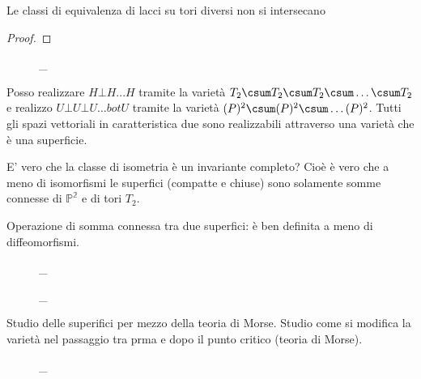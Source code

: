 
\begin{teo}
Le classi di equivalenza di lacci su tori diversi non si intersecano
\end{teo}
\begin{proof}
\end{proof}

\begin{figure}
	\centering 
	
	\caption{\_}
\end{figure}

\begin{oss}
Posso realizzare $H \bot H ... H$ tramite la varietà $T_{2} \csum T_{2} \csum T_{2} \csum \dots \csum T_{2}$ e realizzo $U \bot U \bot U \dots bot U$ tramite la varietà $\mathbb(P)^2 \csum \mathbb(P)^2 \csum \dots \mathbb(P)^2$. Tutti gli spazi vettoriali in caratteristica due sono realizzabili attraverso una varietà che è una superficie.
\end{oss}

E' vero che la classe di isometria è un invariante completo? Cioè è vero che a meno di isomorfismi le superfici (compatte e chiuse) sono solamente somme connesse di $\mathbb{P^2}$ e di tori $T_{2}$.

Operazione di somma connessa tra due superfici: è ben definita a meno di diffeomorfismi.

\begin{figure}
	\centering 
	
	\caption{\_}
\end{figure}

\begin{figure}
	\centering 
	
	\caption{\_}
\end{figure}

Studio delle superifici per mezzo della teoria di Morse. Studio come si modifica la varietà nel passaggio tra prma e dopo il
punto critico (teoria di Morse).

\begin{figure}
	\centering 
	
	\caption{\_}
\end{figure}

